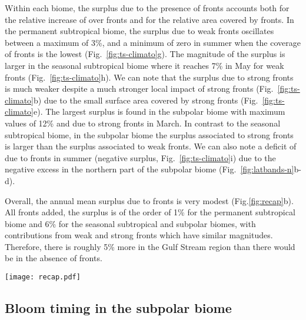 Within each biome, the surplus  due to the presence of fronts accounts both for the relative increase of  over fronts and for the relative area covered by fronts.
In the permanent subtropical biome, the surplus due to weak fronts oscillates between a maximum of 3\%, and a minimum of zero in summer when the coverage of fronts is the lowest (Fig.~\ref{fig:ts-climato}g).
The magnitude of the surplus is larger in the seasonal subtropical biome where it reaches 7\% in May for weak fronts (Fig.~\ref{fig:ts-climato}h).
We can note that the surplus due to strong fronts is much weaker despite a much stronger local impact of strong fronts (Fig.~\ref{fig:ts-climato}b) due to the small surface area covered by strong fronts (Fig.~\ref{fig:ts-climato}e).
The largest surplus is found in the subpolar biome with maximum values of 12\% and due to strong fronts in March.
In contrast to the seasonal subtropical biome, in the subpolar biome the surplus associated to strong fronts is larger than the surplus associated to weak fronts.
We can also note a deficit of  due to fronts in summer (negative surplus, Fig.~\ref{fig:ts-climato}i) due to the negative excess in the northern part of the subpolar biome (Fig.~\ref{fig:latbands-n}b-d).

Overall, the annual mean  surplus due to fronts is very modest (Fig.\ref{fig:recap}b).
All fronts added, the surplus is of the order of 1\% for the permanent subtropical biome and 6\% for the seasonal subtropical and subpolar biomes, with contributions from weak and strong fronts which have similar magnitudes.
Therefore, there is roughly 5\% more  in the Gulf Stream region than there would be in the absence of fronts.

\begin{figure*}
  \texttt{[image: recap.pdf]}
  \caption{
    (a) Annual mean local   excess over fronts (in \%), sorted by latitudinal band (x-axis),  by biome (shape of symbol) and by front type (weak fronts in blue, strong fronts in green).
    (b) Annual mean global surplus of  (in \%) for each biome, sorted by front type.
  }%
  \label{fig:recap}
\end{figure*}


\subsection{Bloom timing in the subpolar biome}

